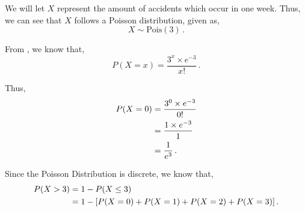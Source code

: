%
%


\begin{subquestions}
	
\subquestion

We will let $X$ represent the amount of accidents which occur in one week. Thus, we can see that $X$ follows a Poisson distribution, given as,
\begin{equation}
	X \sim \text{Pois}(3) \,.
\end{equation}
	
\begin{subsubquestions}
	
\subsubquestion

From , we know that,
\begin{equation}
	P(X = x) =\frac{ 3 ^ x \times e^{-3}}{x!} \,. \label{2011:q4:Poisson1}
\end{equation}
	
Thus,
\begin{align}
	P(X=0) & = \frac{ 3 ^0 \times e^{-3}}{0!} \nonumber \\
	       & = \frac{ 1 \times e^{-3}}{1} \nonumber \\
	       & = \frac{1}{e^3} \,.
\end{align}
	

\subsubquestion

Since the Poisson Distribution is discrete, we know that,
\begin{align}
	P(X>3) & =1-P(X \leq 3) \nonumber \\
	       & = 1 - [P(X=0)+P(X=1)+P(X=2)+P(X=3)] \,.
\end{align}


\end{subsubquestions}
\end{subquestions}

